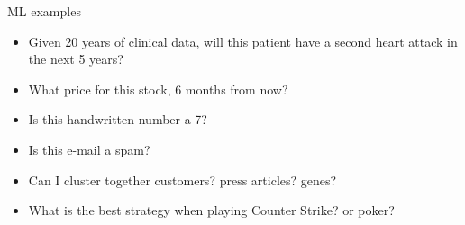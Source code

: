 \documentclass{beamer}
\begin{document}
\begin{frame}{ML examples}
\begin{overlayarea}{\textwidth}{5cm}
\begin{itemize}
\item<1-> Given 20 years of clinical data, will this patient have a second heart attack in the next 5 years?
\item<2-> What price for this stock, 6 months from now?
\item<3-> Is this handwritten number a 7?
\item<4-> Is this e-mail a spam?
\item<5-> Can I cluster together customers? press articles? genes?
\item<6-> What is the best strategy when playing Counter Strike? or poker?
\end{itemize}
\end{overlayarea}
\begin{overlayarea}{\textwidth}{2.5cm}
\begin{center}

\end{center}
\end{overlayarea}
\end{frame}
\end{document}
